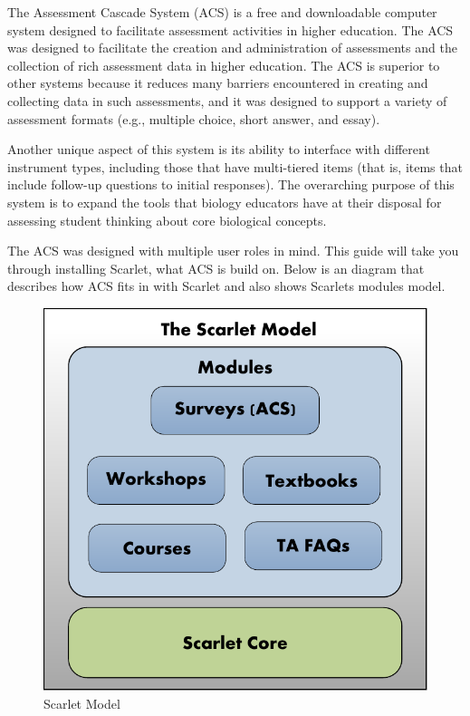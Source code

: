 \documentclass[pdftex,11pt,letterpaper]{article}
\begin{document}
The Assessment Cascade System (ACS) is a free and downloadable computer system 
designed to facilitate assessment activities in higher education. The ACS was 
designed to facilitate the creation and administration of assessments and the 
collection of rich assessment data in higher education.  The ACS is superior to 
other systems because it reduces many barriers encountered in creating and 
collecting data in such assessments, and it was designed to support a variety 
of assessment formats (e.g., multiple choice, short answer, and essay).
 
Another unique aspect of this system is its ability to interface with different 
instrument types, including those that have multi-tiered items (that is, items 
that include follow-up questions to initial responses). The overarching purpose 
of this system is to expand the tools that biology educators have at their 
disposal for assessing student thinking about core biological concepts.
  
The ACS was designed with multiple user roles in 
mind. This guide will take you through installing Scarlet, what ACS is build 
on. Below is an diagram that describes how ACS fits in with Scarlet and also 
shows Scarlets modules model.

\begin{figure}[H]
  \begin{center}
    \leavevmode
    \includegraphics[]{scarlet_images/scarlet_model.pdf}
  \end{center}
  \caption{Scarlet Model}
  \label{fig:scarlet_model}
\end{figure}
\end{document}
